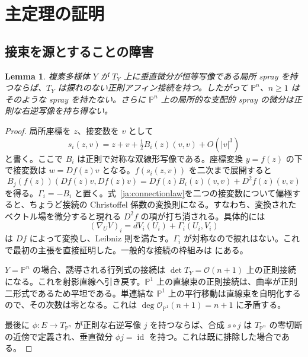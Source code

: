 \documentclass[12pt]{amsart}
\newtheorem{lem}[thm]{Lemma}
\theoremstyle{definition}
\theoremstyle{remark}
\numberwithin{equation}{section}
\newcommand{\cO}{\mathcal{O}}
\DeclareMathOperator{\id}{id}
\newcommand{\mP}{\mathbb{P}}
\begin{document}
\section{主定理の証明}
\subsection{接束を源とすることの障害}
\begin{lem}\label{ja:connection}
複素多様体 $Y$ が $T_Y$ 上に垂直微分が恒等写像である局所 spray を持つならば、$T_Y$ は捩れのない正則アフィン接続を持つ。したがって $\mP^n$、$n\geq1$ はそのような spray を持たない。さらに $\mP^n$ 上の局所的な支配的 spray の微分は正則な右逆写像を持ち得ない。
\end{lem}
\begin{proof}
局所座標を $z$、接変数を $v$ として
\[
s_i(z,v)=z+v+\tfrac12 B_i(z)(v,v)+O(|v|^3)
\]
と書く。ここで $B_i$ は正則で対称な双線形写像である。座標変換 $y=f(z)$ の下で接変数は $w=Df(z)v$ となる。$f(s_i(z,v))$ を二次まで展開すると
\begin{equation}\label{ja:connectionlaw}
B_j(f(z))(Df(z)v,Df(z)v)
=Df(z)B_i(z)(v,v)+D^2f(z)(v,v)
\end{equation}
を得る。$\Gamma_i=-B_i$ と置く。式~\eqref{ja:connectionlaw}を二つの接変数について偏極すると、ちょうど接続の Christoffel 係数の変換則になる。すなわち、変換されたベクトル場を微分すると現れる $D^2f$ の項が打ち消される。具体的には
\[
(\nabla_U V)_i=dV_i(U_i)+\Gamma_i(U_i,V_i)
\]
は $Df$ によって変換し、Leibniz 則を満たす。$\Gamma_i$ が対称なので捩れはない。これで最初の主張を直接証明した。一般的な接続の枠組みは \cite{ja:Atiyah} にある。

$Y=\mP^n$ の場合、誘導される行列式の接続は $\det T_Y=\cO(n+1)$ 上の正則接続になる。これを射影直線へ引き戻す。$\mP^1$ 上の直線束の正則接続は、曲率が正則二形式であるため平坦である。単連結な $\mP^1$ 上の平行移動は直線束を自明化するので、その次数は零となる。これは $\deg\cO_{\mP^1}(n+1)=n+1$ に矛盾する。

最後に $\phi:E\to T_{\mP^n}$ が正則な右逆写像 $j$ を持つならば、合成 $s\circ j$ は $T_{\mP^n}$ の零切断の近傍で定義され、垂直微分 $\phi j=\id$ を持つ。これは既に排除した場合である。
\end{proof}
\end{document}
